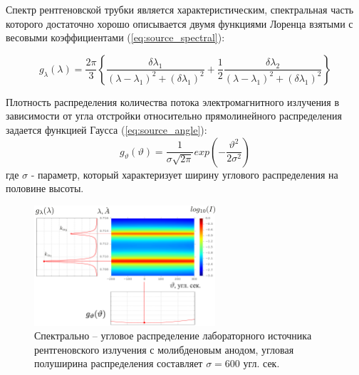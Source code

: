 \label{sec:source_section}
Спектр рентгеновской трубки является характеристическим, спектральная часть
 которого достаточно хорошо описывается двумя функциями Лоренца взятыми с
 весовыми коэффициентами (\ref{eq:source_spectral}):

 \begin{equation} \label{eq:source_spectral}
   g_{\lambda} (\lambda) = \frac{2\pi}{3}  \left \{ \frac{\delta\lambda_1}{(\lambda - \lambda_1)^2+
   (\delta \lambda_1)^2} + \frac{1}{2} \frac{\delta\lambda_2}{(\lambda-\lambda_1)^2+(\delta\lambda_1)^2} \right \}
  \end{equation}

  Плотность распределения количества потока электромагнитного излучения в зависимости от угла
  отстройки относительно прямолинейного распределения задается функцией Гаусса (\ref{eq:source_angle}):
\begin{equation} \label{eq:source_angle}
  g_{\vartheta} (\vartheta) = \frac{1}{\sigma \sqrt{ 2\pi}} exp  ( -\frac{\vartheta^2}{2\sigma^2} )
 \end{equation}
\noindent
где $\sigma$ - параметр, который характеризует ширину углового распределения на половине высоты.

\begin{figure}[H]
  \centering
  \includegraphics[width=0.6\textwidth]{images/source_distrubition.png}
  \caption{Спектрально – угловое распределение лабораторного источника рентгеновского
   излучения с молибденовым анодом, угловая полуширина распределения составляет $\sigma = 600$ угл. сек. }
  \label{ris:source_distrubition}
\end{figure}
